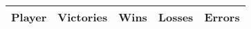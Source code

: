 \documentclass[pdftex,...]{article}%
\newcommand{\onegame}[1]{
    \begin{tabular}{c}
    #1 \\
    \begin{tabular}{cc}
        \texttt{[image: \#1]} &
        \begin{tabular}[b]{ccccc}
            Turn & Player & Move & Judge & Time\\
            \hline
            
            \hline
        \end{tabular}
    \end{tabular}
    \end{tabular}
}
\begin{document}
%        
\begin{tabular}[b]{ccccc}
    Player & Victories & Wins & Losses & Errors \\
    \hline
    
    \hline
\end{tabular}


\end{document}
